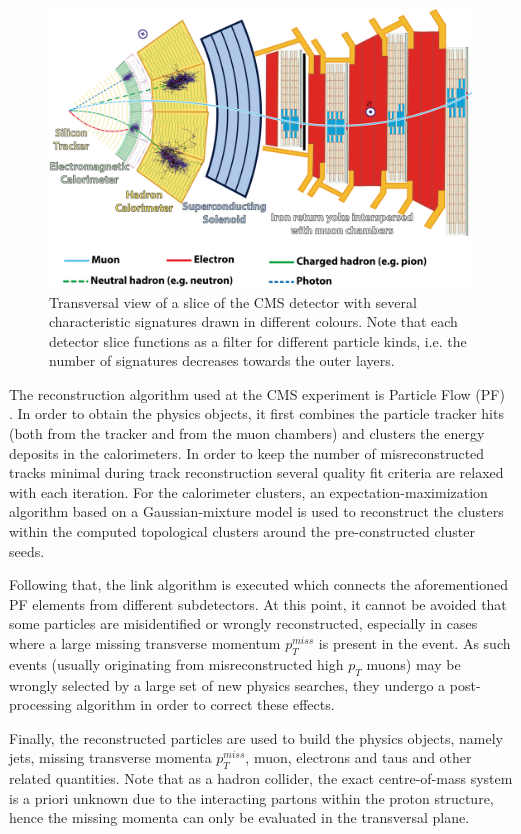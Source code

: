 \begin{figure}[h!]
	\centering
	\includegraphics[width=0.8\linewidth]{figures/experiment/CMS_Slice}
	\caption{Transversal view of a slice of the CMS detector with several characteristic signatures drawn in different colours. Note that each detector slice functions as a filter for different particle kinds, i.e. the number of signatures decreases towards the outer layers. \cite{Barney:2120661}}
	\label{fig:cms_slice}
\end{figure}

The reconstruction algorithm used at the CMS experiment is Particle Flow (PF) \cite{Sirunyan_2017}. In order to obtain the physics objects, it first combines the particle tracker hits (both from the tracker and from the muon chambers) and clusters the energy deposits in the calorimeters. In order to keep the number of misreconstructed tracks minimal during track reconstruction several quality fit criteria are relaxed with each iteration. For the calorimeter clusters, an expectation-maximization algorithm based on a Gaussian-mixture model is used to reconstruct the clusters within the computed topological clusters around the pre-constructed cluster seeds.

Following that, the link algorithm is executed which connects the aforementioned PF elements from different subdetectors. At this point, it cannot be avoided that some particles are misidentified or wrongly reconstructed, especially in cases where a large missing transverse momentum $p^{miss}_T$ is present in the event. As such events (usually originating from misreconstructed high $p_T$ muons) may be wrongly selected by a large set of new physics searches, they undergo a post-processing algorithm in order to correct these effects.

Finally, the reconstructed particles are used to build the physics objects, namely jets, missing transverse momenta $p^{miss}_T$, muon, electrons and taus and other related quantities. Note that as a hadron collider, the exact centre-of-mass system is a priori unknown due to the interacting partons within the proton structure, hence the missing momenta can only be evaluated in the transversal plane.

